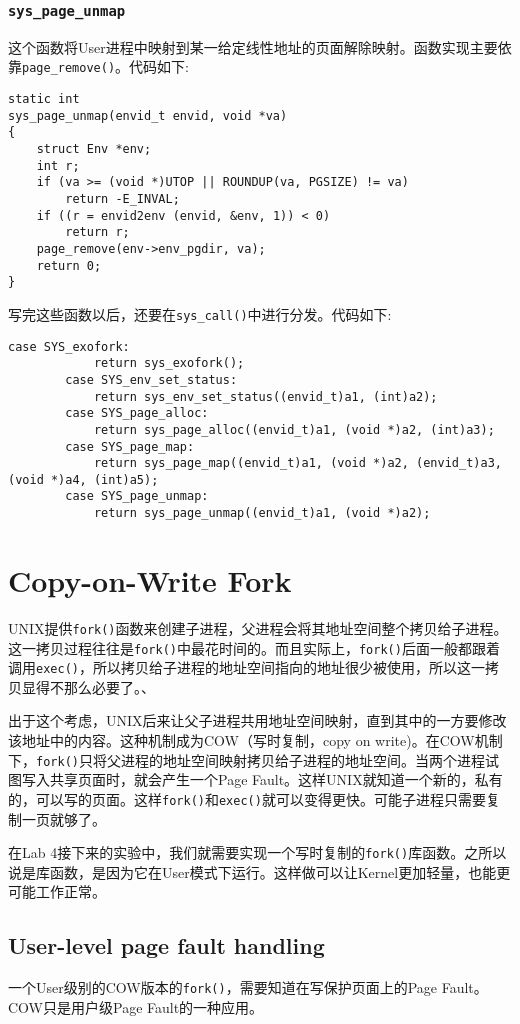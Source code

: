 \documentclass[11pt]{article}
\begin{document}
\subsubsection{\lstinline|sys_page_unmap|}
这个函数将User进程中映射到某一给定线性地址的页面解除映射。函数实现主要依靠\lstinline|page_remove()|。代码如下:
\begin{lstlisting}[title=kern/syscall.c]
static int
sys_page_unmap(envid_t envid, void *va)
{
	struct Env *env;
	int r;
	if (va >= (void *)UTOP || ROUNDUP(va, PGSIZE) != va)
		return -E_INVAL;
	if ((r = envid2env (envid, &env, 1)) < 0)
		return r;
	page_remove(env->env_pgdir, va);
	return 0;
}
\end{lstlisting}

写完这些函数以后，还要在\lstinline|sys_call()|中进行分发。代码如下:
\begin{lstlisting}[title=kern/syscall.c]
		case SYS_exofork:
			return sys_exofork();
		case SYS_env_set_status:
			return sys_env_set_status((envid_t)a1, (int)a2);
		case SYS_page_alloc:
			return sys_page_alloc((envid_t)a1, (void *)a2, (int)a3);
		case SYS_page_map:
			return sys_page_map((envid_t)a1, (void *)a2, (envid_t)a3, (void *)a4, (int)a5);
		case SYS_page_unmap: 
			return sys_page_unmap((envid_t)a1, (void *)a2); 
\end{lstlisting}

\section{Copy-on-Write Fork}
UNIX提供\lstinline|fork()|函数来创建子进程，父进程会将其地址空间整个拷贝给子进程。这一拷贝过程往往是\lstinline|fork()|中最花时间的。而且实际上，\lstinline|fork()|后面一般都跟着调用\lstinline|exec()|，所以拷贝给子进程的地址空间指向的地址很少被使用，所以这一拷贝显得不那么必要了。、

出于这个考虑，UNIX后来让父子进程共用地址空间映射，直到其中的一方要修改该地址中的内容。这种机制成为COW（写时复制，copy on write)。在COW机制下，\lstinline|fork()|只将父进程的地址空间映射拷贝给子进程的地址空间。当两个进程试图写入共享页面时，就会产生一个Page Fault。这样UNIX就知道一个新的，私有的，可以写的页面。这样\lstinline|fork()|和\lstinline|exec()|就可以变得更快。可能子进程只需要复制一页就够了。
 
在Lab 4接下来的实验中，我们就需要实现一个写时复制的\lstinline|fork()|库函数。之所以说是库函数，是因为它在User模式下运行。这样做可以让Kernel更加轻量，也能更可能工作正常。

\subsection{User-level page fault handling}
一个User级别的COW版本的\lstinline|fork()|，需要知道在写保护页面上的Page Fault。COW只是用户级Page Fault的一种应用。
 
\end{document}
